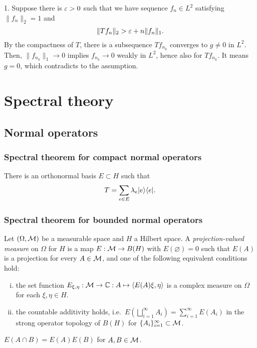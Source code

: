 \documentclass{../../large}
\begin{document}
\begin{pf}
1. Suppose there is $\varepsilon>0$ such that we have sequence $f_n\in L^2$ satisfying $\|f_n\|_2=1$ and
\[\|Tf_n\|_2>\varepsilon+n\|f_n\|_1.\]
By the compactness of $T$, there is a subsequence $Tf_{n_k}$ converges to $g\ne0$ in $L^2$.
Then, $\|f_{n_k}\|_1\to0$ implies $f_{n_k}\to0$ weakly in $L^2$, hence also for $Tf_{n_k}$.
It means $g=0$, which contradicts to the assumption.
\end{pf}







\part{Spectral theory}


\chapter{Normal operators}
\section{Spectral theorem for compact normal operators}
There is an orthonormal basis $E\subset H$ such that
\[T=\sum_{e\in E}\lambda_e|e\rangle\langle e|.\]

\section{Spectral theorem for bounded normal operators}

\begin{prb}
Let $(\Omega,\mathcal{M})$ be a measurable space and $H$ a Hilbert space.
A \emph{projection-valued measure} on $\Omega$ for $H$ is a map $E:\mathcal{M}\to B(H)$ with $E(\varnothing)=0$ such that $E(A)$ is a projection for every $A\in\mathcal{M}$, and one of the following equivalent conditions hold:
\begin{enumerate}[(i)]
\item the set function $E_{\xi,\eta}:\mathcal{M}\to\mathbb{C}:A\mapsto\langle E(A)\xi,\eta\rangle$ is a complex measure on $\Omega$ for each $\xi,\eta\in H$.
\item the countable additivity holds, i.e.~$E(\bigsqcup_{i=1}^\infty A_i)=\sum_{i=1}^\infty E(A_i)$ in the strong operator topology of $B(H)$ for $\{A_i\}_{i=1}^\infty\subset\mathcal{M}$.
\end{enumerate}
\begin{parts}
\item $E(A\cap B)=E(A)E(B)$ for $A,B\in\mathcal{M}$.
\end{parts}
\end{prb}
\end{document}
